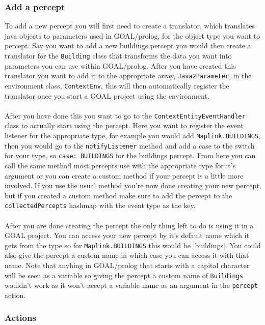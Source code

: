\subsubsection{Add a percept}
To add a new percept you will first need to create a translator, which translates java objects to parameters used in GOAL/prolog, for the object type you want to percept. Say you want to add a new buildings percept you would then create a translator for the \verb|Building| class that transforms the data you want into parameters you can use within GOAL/prolog.
After you have created this translator you want to add it to the appropriate array, \verb|Java2Parameter|, in the environment class, \verb|ContextEnv|, this will then automatically register the translator once you start a GOAL project using the environment.\\
\\
After you have done this you want to go to the \verb|ContextEntityEventHandler| class to actually start using the percept.
Here you want to register the event listener for the appropriate type, for example you would add \verb|Maplink.BUILDINGS|, then you would go to the \verb|notifyListener| method and add a case to the switch for your type, so \verb|case: BUILDINGS| for the buildings percept.
From here you can call the same method most percepts use with the appropriate type for it's argument or you can create a custom method if your percept is a little more involved.
If you use the usual method you're now done creating your new percept, but if you created a custom method make sure to add the percept to the \verb|collectedPercepts| hashmap with the event type as the key.\\
\\
After you are done creating the percept the only thing left to do is using it in a GOAL project. You can access your new percept by it's default name which it gets from the type so for \verb|Maplink.BUILDINGS| this would be |buildings|. You could also give the percept a custom name in which case you can access it with that name. Note that anyhing in GOAL/prolog that starts with a capital character will be seen as a variable so giving the percept a custom name of \verb|Buildings| wouldn't work as it won't accept a variable name as an argument in the \verb|percept| action.

\subsubsection{Actions}

